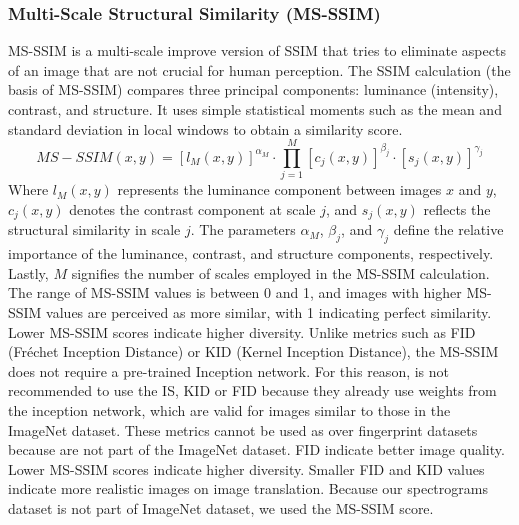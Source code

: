 \documentclass[journal]{IEEEtran}
\begin{document}
\subsubsection{Multi-Scale Structural Similarity (MS-SSIM)}
MS-SSIM is a multi-scale improve version of SSIM that tries to eliminate aspects of an image that are not crucial for human perception\cite{wang2003multiscale,ma2016group}. The SSIM calculation (the basis of MS-SSIM) compares three principal components: luminance (intensity), contrast, and structure. It uses simple statistical moments such as the mean and standard deviation in local windows to obtain a similarity score.
$$MS-SSIM(x,y)=\left[l_M (x,y)\right]^{\alpha_M}\cdot \prod_{j=1}^{M}\left[c_j(x,y)\right]^{\beta_j}\cdot \left[s_j (x,y)\right]^{\gamma_j}$$
Where $l_M (x,y)$ represents the luminance component between images $x$ and $y$, $c_j(x,y)$ denotes the contrast component at scale $j$, and $s_j(x,y)$ reflects the structural similarity in scale $j$. The parameters $\alpha_M$, $\beta_j$, and $\gamma_j$ define the relative importance of the luminance, contrast, and structure components, respectively. Lastly, $M$ signifies the number of scales employed in the MS-SSIM calculation\cite{arsenio2025recovering}.
The range of MS-SSIM values is between 0 and 1, and images with higher MS-SSIM values are perceived as more similar\cite{odena2017conditional}, with 1 indicating perfect similarity. Lower MS-SSIM scores indicate higher diversity\cite{guo2019autoembedding,wang2019improvingmmdgantrainingrepulsive}.
Unlike metrics such as FID (Fréchet Inception Distance) or KID (Kernel Inception Distance), the MS-SSIM does not require a pre-trained Inception network\cite{fahim2020alightweight}. For this reason, is not recommended to use the IS, KID or FID because they already use weights from the inception network, which are valid for images similar to those in the ImageNet dataset. These metrics cannot be used as over fingerprint datasets because are not part of the ImageNet dataset\cite{fahim2020alightweight}.
FID indicate better image quality. Lower MS-SSIM scores indicate higher diversity\cite{guo2019autoembedding}. Smaller FID and KID values indicate more realistic images on image translation\cite{torbunov2023rethinking}.
Because our spectrograms dataset is not part of ImageNet dataset, we used the MS-SSIM score.
\end{document}
